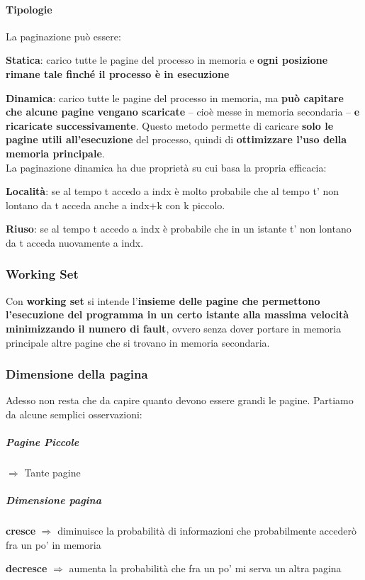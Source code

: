 \documentclass[10pt]{report}
\begin{document}
\paragraph{Tipologie} La paginazione può essere:
\begin{list}{}{}
	\item \textbf{Statica}: carico tutte le pagine del processo in memoria e \textbf{ogni posizione rimane tale finché il processo è in esecuzione}
	\item \textbf{Dinamica}: carico tutte le pagine del processo in memoria, ma \textbf{può capitare che alcune pagine vengano scaricate} -- cioè messe in memoria secondaria -- \textbf{e ricaricate successivamente}. Questo metodo permette di caricare \textbf{solo le pagine utili all'esecuzione} del processo, quindi di \textbf{ottimizzare l'uso della memoria principale}.\\
	La paginazione dinamica ha due proprietà su cui basa la propria efficacia:
	\begin{list}{}{}
		\item \textbf{Località}: se al tempo t accedo a indx è molto probabile che al tempo t' non lontano da t acceda anche a indx+k con k piccolo.
		\item \textbf{Riuso}: se al tempo t accedo a indx è probabile che in un istante t' non lontano da t acceda nuovamente a indx.
	\end{list}
\end{list}
\subsubsection{Working Set}
Con \textbf{working set} si intende l'\textbf{insieme delle pagine che permettono l'esecuzione del programma in un certo istante alla massima velocità minimizzando il numero di fault}, ovvero senza dover portare in memoria principale altre pagine che si trovano in memoria secondaria.
\pagebreak
\subsubsection{Dimensione della pagina}
Adesso non resta che da capire quanto devono essere grandi le pagine. Partiamo da alcune semplici osservazioni:
\subparagraph{Pagine Piccole} $\Rightarrow$ Tante pagine
\subparagraph{Dimensione pagina}
\begin{list}{}{}
	\item \textbf{cresce} $\Rightarrow$ diminuisce la probabilità di informazioni che probabilmente accederò fra un po' in memoria
	\item \textbf{decresce} $\Rightarrow$ aumenta la probabilità che fra un po' mi serva un altra pagina
\end{list}
\end{document}
